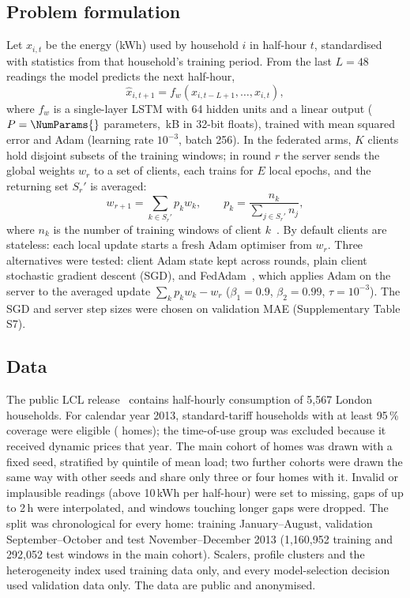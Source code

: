 \subsection{Problem formulation}
Let $x_{i,t}$ be the energy (kWh) used by household $i$ in half-hour $t$, standardised with statistics from that
household's training period. From the last $L=48$ readings the model predicts the next half-hour,
\begin{equation}\label{eq:task}
\hat{x}_{i,t+1}=f_w\left(x_{i,t-L+1},\ldots,x_{i,t}\right),
\end{equation}
where $f_w$ is a single-layer LSTM with 64 hidden units and a linear output ($P=\NumParams{}$ parameters,
\PayloadKB{}\,kB in 32-bit floats), trained with mean squared error and Adam (learning rate $10^{-3}$, batch 256). In
the federated arms, $K$ clients hold disjoint subsets of the training windows; in round $r$ the server sends the global
weights $w_r$ to a set of clients, each trains for $E$ local epochs, and the returning set $S_r'$ is averaged:
\begin{equation}\label{eq:fedavg}
w_{r+1}=\sum_{k\in S_r'}p_k w_k,\qquad p_k=\frac{n_k}{\sum_{j\in S_r'}n_j},
\end{equation}
where $n_k$ is the number of training windows of client $k$~\cite{mcmahan2017fedavg}. By default clients are
stateless: each local update starts a fresh Adam optimiser from $w_r$. Three alternatives were tested: client Adam
state kept across rounds, plain client stochastic gradient descent (SGD), and FedAdam~\cite{reddi2021fedopt}, which
applies Adam on the server to the averaged update $\sum_k p_k w_k-w_r$ ($\beta_1=0.9$, $\beta_2=0.99$,
$\tau=10^{-3}$). The SGD and server step sizes were chosen on validation MAE (Supplementary Table S7).

\subsection{Data}
The public LCL release~\cite{ukpn2015lcl} contains half-hourly consumption of 5{,}567 London households. For calendar
year 2013, standard-tariff households with at least 95\,\% coverage were eligible (\HouseholdsEligible{} homes); the
time-of-use group was excluded because it received dynamic prices that year. The main cohort of \NumHouseholds{} homes
was drawn with a fixed seed, stratified by quintile of mean load; two further cohorts were drawn the same way with other
seeds and share only three or four homes with it. Invalid or implausible readings (above 10\,kWh per half-hour) were
set to missing, gaps of up to 2\,h were interpolated, and windows touching longer gaps were dropped. The split was
chronological for every home: training January--August, validation September--October and test November--December
2013 (1{,}160{,}952 training and 292{,}052 test windows in the main cohort). Scalers, profile clusters and the
heterogeneity index used training data only, and every model-selection decision used validation data only. The data
are public and anonymised.

